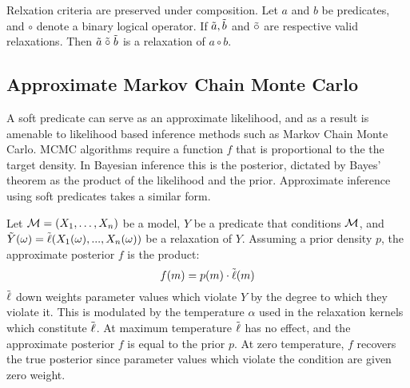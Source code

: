 \begin{proposition}Relxation criteria are preserved under composition.
Let $a$ and $b$ be predicates, and $\circ$ denote a binary logical operator.  If $\tilde{a}, \tilde{b}$ and $\mathrel{\tilde{\circ}}$ are respective valid relaxations.  Then $\tilde{a} \mathrel{\tilde{\circ}} \tilde{b}$ is a relaxation of $a \circ b$.
\end{proposition}



\subsection{Approximate Markov Chain Monte Carlo}
A soft predicate can serve as an approximate likelihood, and as a result is amenable to likelihood based inference methods such as Markov Chain Monte Carlo.
MCMC algorithms require a function $f$ that is proportional to the the target density.
In Bayesian inference this is the posterior, dictated by Bayes' theorem as the product of the likelihood and the prior.
Approximate inference using soft predicates takes a similar form.

Let ${\mathcal{M}} = (X_1, \dots, X_n)$ be a model, $Y$ be a predicate that conditions ${\mathcal{M}}$, and  $\tilde{Y}(\omega) = \tilde{\operatorname{\ell}}(X_1(\omega), ..., X_n(\omega))$ be a relaxation of $Y$.
Assuming a prior density $p$, the approximate posterior $f$ is the product:
\begin{equation}
f(m) = p(m) \cdot \tilde{\operatorname{\ell}}(m)
\end{equation}
$\tilde{\operatorname{\ell}}$ down weights parameter values which violate $Y$ by the degree to which they violate it. 
This is modulated by the temperature $\alpha$ used in the  relaxation kernels which constitute $\tilde{\operatorname{\ell}}$.
At maximum temperature $\tilde{\operatorname{\ell}}$ has no effect, and the approximate posterior $f$ is equal to the prior $p$.
At zero temperature, $f$ recovers the true posterior since parameter values which violate the condition are given zero weight.

